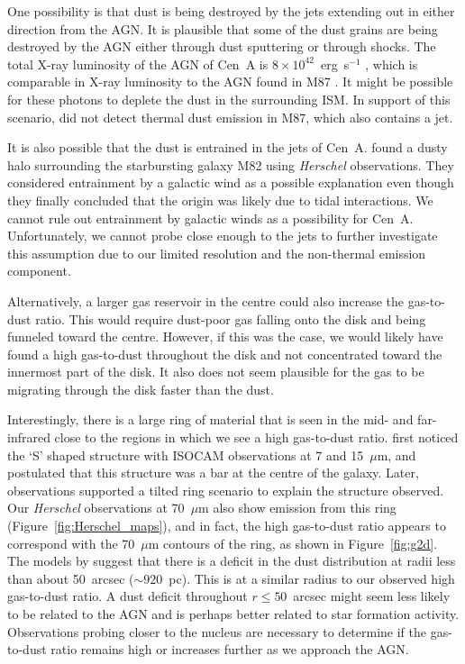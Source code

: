 \documentclass[useAMS,usenatbib,usegraphicx]{mn2e}
\begin{document}
One possibility is that dust is being destroyed by the jets extending out in either direction from the AGN.  It is plausible that some of the dust grains are being destroyed by the AGN either through dust sputtering or through shocks.  The total X-ray luminosity of the AGN of Cen~A is $8 \times 10^{42}$~erg~s$^{-1}$ \citep{2011ApJ...733...23R}, which is comparable in X-ray luminosity to the AGN found in M87 \citep{2006A&A...459..353W}.  It might be possible for these photons to deplete the dust in the surrounding ISM.  In support of this scenario, \citet{2010A&A...518L..53B} did not detect thermal dust emission in M87, which also contains a jet.

It is also possible that the dust is entrained in the jets of Cen~A.  \citet{2010A&A...518L..66R} found a dusty halo surrounding the starbursting galaxy M82 using \emph{Herschel} observations.  They considered entrainment by a galactic wind as a possible explanation even though they finally concluded that the origin was likely due to tidal interactions.  We cannot rule out entrainment by galactic winds as a possibility for Cen~A.  Unfortunately, we cannot probe close enough to the jets to further investigate this assumption due to our limited resolution and the non-thermal emission component.

Alternatively, a larger gas reservoir in the centre could also increase the gas-to-dust ratio.  This would require dust-poor gas falling onto the disk and being funneled toward the centre.  However, if this was the case, we would likely have found a high gas-to-dust throughout the disk and not concentrated toward the innermost part of the disk.  It also does not seem plausible for the gas to be migrating through the disk faster than the dust.

Interestingly, there is a large ring of material that is seen in the mid- and far-infrared close to the regions in which we see a high gas-to-dust ratio.  \citet{1999A&A...341..667M} first noticed the `S' shaped structure with ISOCAM observations at 7 and 15~$\mu$m, and postulated that this structure was a bar at the centre of the galaxy.  Later, observations \citep{2002ApJ...565..131L,2006ApJ...645.1092Q} supported a tilted ring scenario to explain the structure observed.  Our \emph{Herschel} observations at 70~$\mu$m also show emission from this ring (Figure~\ref{fig:Herschel_maps}), and in fact, the high gas-to-dust ratio appears to correspond with the 70~$\mu$m contours of the ring, as shown in Figure~\ref{fig:g2d}.  The models by \citet{2006ApJ...645.1092Q} suggest that there is a deficit in the dust distribution at radii less than about 50~arcsec ($\sim 920$~pc).  This is at a similar radius to our observed high gas-to-dust ratio.  A dust deficit throughout $r \le 50$~arcsec might seem less likely to be related to the AGN and is perhaps better related to star formation activity.  Observations probing closer to the nucleus are necessary to determine if the gas-to-dust ratio remains high or increases further as we approach the AGN.
\end{document}

